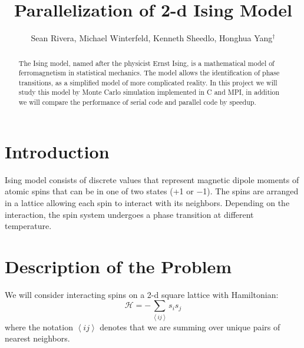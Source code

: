 \documentclass[runningheads]{llncs}
\begin{document}
%
%
\pagestyle{headings}  %
%
\title{Parallelization of 2-d Ising Model}

\author{Sean Rivera, Michael Winterfeld, Kenneth Sheedlo, Honghua Yang$^{\dagger}$}



\maketitle              %

\begin{abstract}
The Ising model, named after the physicist Ernst Ising, is a mathematical model of ferromagnetism in statistical mechanics. The model allows the identification of phase transitions, as a simplified model of more complicated reality. In this project we will study this model by Monte Carlo simulation implemented in C and MPI, in addition we will compare the performance of serial code and parallel code by speedup.

\end{abstract}

\section{Introduction}
Ising model consists of discrete values that represent magnetic dipole moments of atomic spins that can be in one of two states (+1 or −1). The spins are arranged in a lattice allowing each spin to interact with its neighbors.
Depending on the interaction, the spin system undergoes a phase transition at different temperature.


\section{Description of the Problem}
We will consider interacting spins on a 2-d square lattice with Hamiltonian:
\begin{equation}
\mathcal{H} = -\sum_{\left<ij\right>}s_is_j 
\end{equation}
where the notation  $\left<ij\right>$ denotes that we are summing over unique pairs of nearest neighbors.
\end{document}
